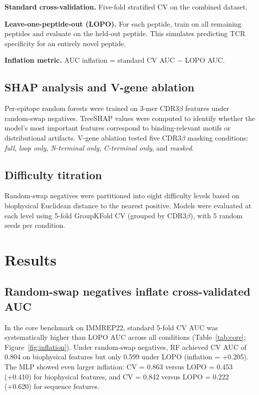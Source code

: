 \documentclass[11pt, a4paper]{article}
\begin{document}
\textbf{Standard cross-validation.} Five-fold stratified CV on the combined dataset.

\textbf{Leave-one-peptide-out (LOPO).} For each peptide, train on all remaining peptides and evaluate on the held-out peptide. This simulates predicting TCR specificity for an entirely novel peptide.

\textbf{Inflation metric.} AUC inflation = standard CV AUC $-$ LOPO AUC.

\subsection{SHAP analysis and V-gene ablation}

Per-epitope random forests were trained on 3-mer CDR3$\beta$ features under random-swap negatives. TreeSHAP values were computed to identify whether the model's most important features correspond to binding-relevant motifs or distributional artifacts. V-gene ablation tested five CDR3$\beta$ masking conditions: \textit{full}, \textit{loop only}, \textit{N-terminal only}, \textit{C-terminal only}, and \textit{masked}.

\subsection{Difficulty titration}

Random-swap negatives were partitioned into eight difficulty levels based on biophysical Euclidean distance to the nearest positive. Models were evaluated at each level using 5-fold GroupKFold CV (grouped by CDR3$\beta$), with 5 random seeds per condition.

\section{Results}

\subsection{Random-swap negatives inflate cross-validated AUC}

In the core benchmark on IMMREP22, standard 5-fold CV AUC was systematically higher than LOPO AUC across all conditions (Table~\ref{tab:core}; Figure~\ref{fig:inflation}). Under random-swap negatives, RF achieved CV AUC of 0.804 on biophysical features but only 0.599 under LOPO (inflation = +0.205). The MLP showed even larger inflation: CV = 0.863 versus LOPO = 0.453 (+0.410) for biophysical features, and CV = 0.842 versus LOPO = 0.222 (+0.620) for sequence features.
\end{document}
